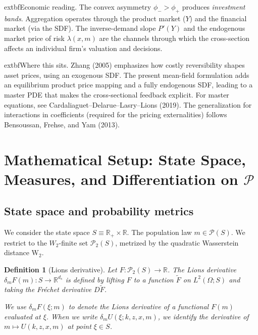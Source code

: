 \documentclass[11pt,letterpaper,oneside]{article}
\newtheorem{definitionT}{Definition}
\newenvironment{definition}[2]{\begin{definitionT}[#1]\label{def:#2}}{\end{definitionT}}
\newcommand{\R}{\mathbb{R}}
\newcommand{\dmU}{\delta_m U}
\newcommand{\Dm}{\delta_m}
\begin{document}
\begin{tcolorbox}[didacticstyle]
      extbf{Economic reading.} The convex asymmetry $\phi_->\phi_+$ produces \emph{investment bands}. Aggregation operates through the product market ($Y$) and the financial market (via the SDF). The inverse-demand slope $P'(Y)$ and the endogenous market price of risk $\lambda(x,m)$ are the channels through which the cross-section affects an individual firm's valuation and decisions.
\end{tcolorbox}

\begin{tcolorbox}[literaturestyle]
    extbf{Where this sits.} Zhang (2005) emphasizes how costly reversibility shapes asset prices, using an exogenous SDF. The present mean-field formulation adds an equilibrium product price mapping and a fully endogenous SDF, leading to a master PDE that makes the cross-sectional feedback explicit. For master equations, see Cardaliaguet--Delarue--Lasry--Lions (2019). The generalization for interactions in coefficients (required for the pricing externalities) follows Bensoussan, Frehse, and Yam (2013).
\end{tcolorbox}

\section{Mathematical Setup: State Space, Measures, and Differentiation on \texorpdfstring{$\mathcal P$}{P}}

\subsection{State space and probability metrics}
We consider the state space $S\equiv \R_+\times\R$. The population law $m\in\mathcal P(S)$. We restrict to the $W_2$-finite set $\mathcal P_2(S)$, metrized by the quadratic Wasserstein distance $\mathrm{W}_2$.

\begin{definition}{Lions derivative}{lions}
Let $F:\mathcal P_2(S)\to\R$. The \emph{Lions derivative} $\Dm F(m):S\to\R^{d_s}$ is defined by lifting $F$ to a function $\tilde F$ on $L^2(\Omega;S)$ and taking the Fréchet derivative $D\tilde F$.

We use $\delta_m F(\xi; m)$ to denote the Lions derivative of a functional $F(m)$ evaluated at $\xi$. When we write $\dmU(\xi;k,z,x,m)$, we identify the derivative of $m\mapsto U(k,z,x,m)$ at point $\xi\in S$.
\end{definition}
\end{document}
